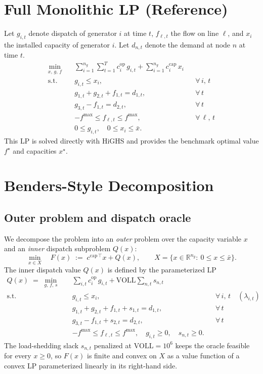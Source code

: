 \documentclass[11pt]{article}
\begin{document}
\section{Full Monolithic LP (Reference)}
Let $g_{i,t}$ denote dispatch of generator $i$ at time $t$,
$f_{\ell,t}$ the flow on line $\ell$, and $x_i$ the installed capacity
of generator $i$. Let $d_{n,t}$ denote the demand at node $n$ at
time $t$.
\begin{align}
    \min_{x,\, g,\, f}\quad
        & \sum_{i=1}^{n_g}\sum_{t=1}^{T} c^{\text{op}}_i\, g_{i,t}
        + \sum_{i=1}^{n_g} c^{\text{cap}}_i\, x_i \label{eq:full-obj} \\
    \text{s.t.}\quad
        & g_{i,t} \le x_i, && \forall\, i,\, t
          \label{eq:cap} \\
        & g_{1,t} + g_{2,t} + f_{1,t} = d_{1,t}, && \forall\, t
          \label{eq:bal-n1} \\
        & g_{3,t} - f_{1,t} = d_{2,t}, && \forall\, t
          \label{eq:bal-n2} \\
        & -f^{\max} \le f_{\ell,t} \le f^{\max}, && \forall\, \ell,\, t \\
        & 0 \le g_{i,t}, \quad 0 \le x_i \le \bar{x}.
\end{align}
This LP is solved directly with HiGHS and provides the benchmark
optimal value $f^\star$ and capacities $x^\star$.

\section{Benders-Style Decomposition}

\subsection{Outer problem and dispatch oracle}
We decompose the problem into an \emph{outer} problem over the capacity
variable $x$ and an \emph{inner} dispatch subproblem $Q(x)$:
\begin{equation}
    \min_{x \in X}\quad F(x) \;:=\; c^{\text{cap}\,\top} x + Q(x),
    \qquad X = \{x \in \mathbb{R}^{n_g}:\ 0 \le x \le \bar{x}\}.
\end{equation}
The inner dispatch value $Q(x)$ is defined by the parameterized LP
\begin{align}
    Q(x) \;=\; \min_{g,\, f,\, s}\quad
        & \sum_{i,t} c^{\text{op}}_i\, g_{i,t}
        + \text{VOLL} \sum_{n,t} s_{n,t} \\
    \text{s.t.}\quad
        & g_{i,t} \le x_i, && \forall\, i,\, t \quad (\lambda_{i,t}) \\
        & g_{1,t} + g_{2,t} + f_{1,t} + s_{1,t} = d_{1,t}, && \forall\, t \\
        & g_{3,t} - f_{1,t} + s_{2,t} = d_{2,t}, && \forall\, t \\
        & -f^{\max} \le f_{\ell,t} \le f^{\max},\quad g_{i,t}\ge 0,\quad s_{n,t}\ge 0.
\end{align}
The load-shedding slack $s_{n,t}$ penalized at
$\text{VOLL} = 10^6$ keeps the oracle feasible for every $x \ge 0$, so
$F(x)$ is finite and convex on $X$ as a value function of a convex LP
parameterized linearly in its right-hand side.
\end{document}
